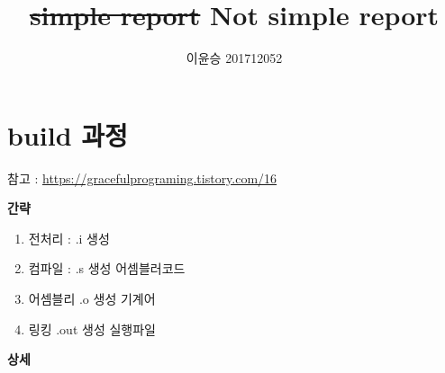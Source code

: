 \documentclass{oblivoir}
\begin{document}
\title{\protect\sout{simple report} Not simple report}
\author{이윤승 201712052}
\maketitle
\tableofcontents

\section{build 과정}
참고 : \url{https://gracefulprograming.tistory.com/16}

\textbf{간략}
\begin{enumerate}
    \item 전처리 : .i 생성
    \item 컴파일 : .s 생성  어셈블러코드
    \item 어셈블리 .o 생성  기계어
    \item 링킹 .out 생성  실행파일
\end{enumerate}

\textbf{상세}
\end{document}
